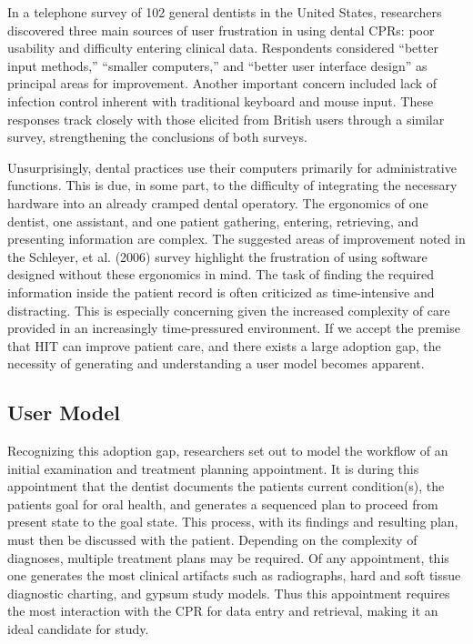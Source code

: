 \documentclass[11pt]{article}
\begin{document}
In a telephone survey of 102 general dentists in the United States, researchers discovered three main sources of user frustration in using dental CPRs: poor usability and difficulty entering clinical data.\cite{Schleyer2006Clinical-Comput} Respondents considered ``better input methods,'' ``smaller computers,'' and ``better user interface design'' as principal areas for improvement. Another important concern included lack of infection control inherent with traditional keyboard and mouse input. These responses track closely with those elicited from British users through a similar survey, strengthening the conclusions of both surveys.\cite{John2003Questionnaire-s}

Unsurprisingly, dental practices use their computers primarily for administrative functions. This is due, in some part, to the difficulty of integrating the necessary hardware into an already cramped dental operatory.\cite{Schleyer2004Why-integration} The ergonomics of one dentist, one assistant, and one patient gathering, entering, retrieving, and presenting information are complex. The suggested areas of improvement noted in the Schleyer, et al. (2006) survey highlight the frustration of using software designed without these ergonomics in mind. The task of finding the required information inside the patient record is often criticized as time-intensive and distracting.\cite{Nygren1998Helping-clinici} This is especially concerning given the increased complexity of care provided in an increasingly time-pressured environment. If we accept the premise that HIT can improve patient care, and there exists a large adoption gap, the necessity of generating and understanding a user model becomes apparent.

\subsection{User Model}
Recognizing this adoption gap, researchers set out to model the workflow of an initial examination and treatment planning appointment.\cite{Irwin2009A-preliminary-m} It is during this appointment that the dentist documents the patients current condition(s), the patients goal for oral health, and generates a sequenced plan to proceed from present state to the goal state. This process, with its findings and resulting plan, must then be discussed with the patient. Depending on the complexity of diagnoses, multiple treatment plans may be required. Of any appointment, this one generates the most clinical artifacts such as radiographs, hard and soft tissue diagnostic charting,  and gypsum study models. Thus this appointment requires the most interaction with the CPR for data entry and retrieval, making it an ideal candidate for study. 
\end{document}
